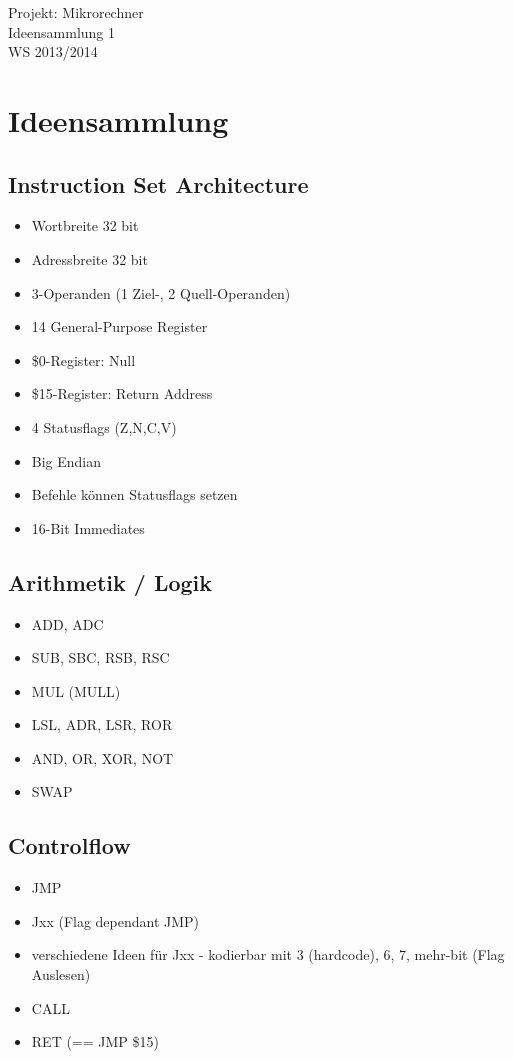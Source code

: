 \documentclass[a4paper]{article}
\newcommand{\titelblock}{
\sloppy
\begin{center}
\sffamily
{\Large{\veranstaltung \\}}
{\Huge{\doctitle  \nummer}\\}
\vspace{0.5cm}
\tutorium \\
\hrulefill
\end{center}
}
\newcommand{\doctitle}{Ideensammlung}
\newcommand{\nummer}{ 1} %
\newcommand{\tutorium}{WS 2013/2014}
\newcommand{\veranstaltung}{Projekt: Mikrorechner}
\begin{document}
\titelblock

\section{Ideensammlung}

\subsection{Instruction Set Architecture}

\begin{itemize}

\item Wortbreite 32 bit
\item Adressbreite 32 bit
\item 3-Operanden (1 Ziel-, 2 Quell-Operanden)
\item 14 General-Purpose Register
\item \$0-Register: Null
\item \$15-Register: Return Address
\item 4 Statusflags (Z,N,C,V)
\item Big Endian
\item Befehle können Statusflags setzen
\item 16-Bit Immediates

\end{itemize}

\subsection{Arithmetik / Logik}

\begin{itemize}
\item ADD, ADC
\item SUB, SBC, RSB, RSC
\item MUL (MULL)
\item LSL, ADR, LSR, ROR 
\item AND, OR, XOR, NOT
\item SWAP
\end{itemize}

\subsection{Controlflow}

\begin{itemize}
\item JMP
\item Jxx (Flag dependant JMP)
\item verschiedene Ideen für Jxx - kodierbar mit 3 (hardcode), 6, 7, mehr-bit (Flag Auslesen)
\item CALL
\item RET (== JMP \$15)
\end{itemize}
\end{document}
